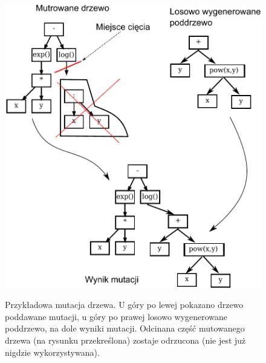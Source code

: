 \begin{figure}[h]
\centering
\includegraphics[scale=0.8]{figures/graphs/2-mutation}
\label{fig:2-mutation}
\caption{Przykładowa mutacja drzewa. U góry po lewej pokazano drzewo poddawane mutacji, u góry po prawej losowo wygenerowane poddrzewo, na dole wyniki mutacji. Odcinana część mutowanego drzewa (na rysunku przekreślona) zostaje odrzucona (nie jest już nigdzie wykorzystywana).} 
\end{figure}


